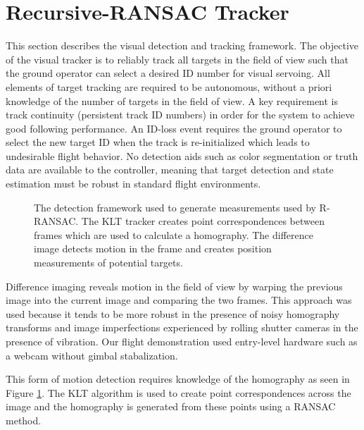 \section{Recursive-RANSAC Tracker}
This section describes the visual detection and tracking framework. The objective of the visual tracker is to reliably track all targets in the field of view such that the ground operator can select a desired ID number for visual servoing. All elements of target tracking are required to be autonomous, without a priori knowledge of the number of targets in the field of view. A key requirement is track continuity (persistent track ID numbers) in order for the system to achieve good following performance. An ID-loss event requires the ground operator to select the new target ID when the track is re-initialized which leads to undesirable flight behavior. No detection aids such as color segmentation or truth data are available to the controller, meaning that target detection and state estimation must be robust in standard flight environments.
\begin{figure}[htbp]
	\centering
	\caption[The detection framework used to generate measurements used by R-RANSAC.]{The detection framework used to generate measurements used by R-RANSAC. The KLT tracker creates point correspondences between frames which are used to calculate a homography. The difference image detects motion in the frame and creates position measurements of potential targets.}
	\label{visual_tracking}
\end{figure}

Difference imaging reveals motion in the field of view by warping the previous image into the current image and comparing the two frames. This approach was used because it tends to be more robust in the presence of noisy homography transforms and image imperfections experienced by rolling shutter cameras in the presence of vibration. Our flight demonstration used entry-level hardware such as a webcam without gimbal stabalization.

This form of motion detection requires knowledge of the homography as seen in Figure \ref{visual_tracking}. The KLT algorithm is used to create point correspondences across the image and the homography is generated from these points using a RANSAC method.

